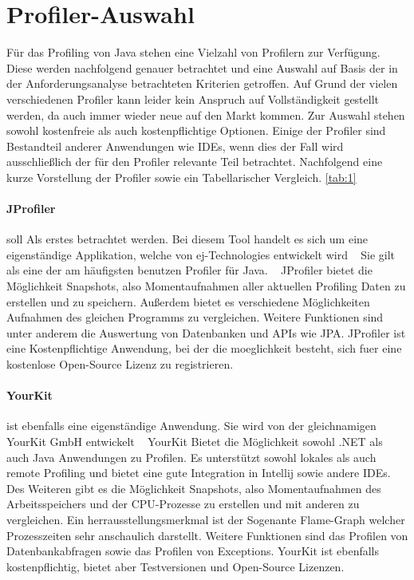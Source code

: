\documentclass{article}
\begin{document}
\section{Profiler-Auswahl}

Für das Profiling von Java stehen eine Vielzahl von Profilern zur Verfügung. ~\cite{Website:1} Diese werden nachfolgend genauer betrachtet und eine Auswahl auf Basis der in der Anforderungsanalyse betrachteten Kriterien getroffen.
Auf Grund der vielen verschiedenen Profiler kann leider kein Anspruch auf Vollständigkeit gestellt werden, da auch immer wieder neue auf den Markt kommen. Zur Auswahl stehen sowohl kostenfreie als auch kostenpflichtige Optionen. Einige der Profiler sind Bestandteil anderer Anwendungen wie IDEs, wenn dies der Fall wird ausschließlich der für den Profiler relevante Teil betrachtet. Nachfolgend eine kurze Vorstellung der Profiler sowie ein Tabellarischer Vergleich. \ref{tab:1}

\paragraph{JProfiler}

soll Als erstes betrachtet werden. Bei diesem Tool handelt es sich um eine eigenständige Applikation, welche von ej-Technologies entwickelt wird ~\cite{WEBSITE:2} Sie gilt als eine der am häufigsten benutzen Profiler für Java. ~\cite{WEBSITE:3} JProfiler bietet die Möglichkeit Snapshots, also Momentaufnahmen aller aktuellen Profiling Daten zu erstellen und zu speichern. Außerdem bietet es verschiedene Möglichkeiten Aufnahmen des gleichen Programms zu vergleichen. Weitere Funktionen sind unter anderem die Auswertung von Datenbanken und APIs wie JPA. JProfiler ist eine Kostenpflichtige Anwendung, bei der die moeglichkeit besteht, sich fuer eine kostenlose Open-Source Lizenz zu registrieren.

\paragraph{YourKit}
ist ebenfalls eine eigenständige Anwendung. Sie wird von der gleichnamigen YourKit GmbH entwickelt ~\cite{WEBSITE:4} YourKit Bietet die Möglichkeit sowohl .NET als auch Java Anwendungen zu Profilen. Es unterstützt sowohl lokales als auch remote Profiling und bietet eine gute Integration in Intellij sowie andere IDEs. Des Weiteren gibt es die Möglichkeit Snapshots, also Momentaufnahmen des Arbeitsspeichers und der CPU-Prozesse zu erstellen und mit anderen zu vergleichen. Ein herrausstellungsmerkmal ist der Sogenante Flame-Graph welcher Prozesszeiten sehr anschaulich darstellt. Weitere Funktionen sind das Profilen von Datenbankabfragen sowie das Profilen von Exceptions. YourKit ist ebenfalls kostenpflichtig, bietet aber Testversionen und Open-Source Lizenzen.
\end{document}

